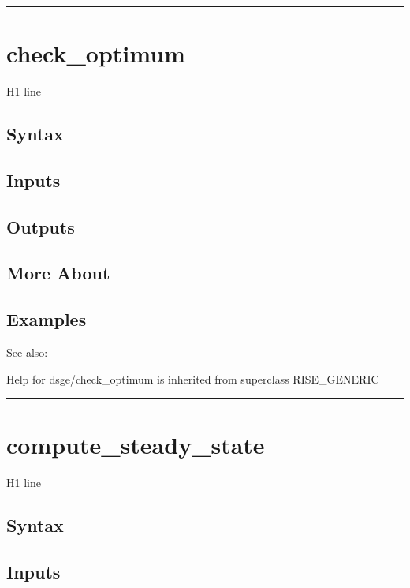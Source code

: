 \documentclass[letterpaper,10pt,english]{sphinxmanual}
\begin{document}
\bigskip\hrule{}\bigskip



\section{check\_optimum}
\label{classes/models/@dsge/dsge:check-optimum}\label{classes/models/@dsge/dsge:id2}
H1 line


\subsection{Syntax}
\label{classes/models/@dsge/dsge:id3}

\subsection{Inputs}
\label{classes/models/@dsge/dsge:id4}

\subsection{Outputs}
\label{classes/models/@dsge/dsge:id5}

\subsection{More About}
\label{classes/models/@dsge/dsge:id6}

\subsection{Examples}
\label{classes/models/@dsge/dsge:id7}
See also:

Help for dsge/check\_optimum is inherited from superclass RISE\_GENERIC


\bigskip\hrule{}\bigskip



\section{compute\_steady\_state}
\label{classes/models/@dsge/dsge:id8}\label{classes/models/@dsge/dsge:compute-steady-state}
H1 line


\subsection{Syntax}
\label{classes/models/@dsge/dsge:id9}

\subsection{Inputs}
\label{classes/models/@dsge/dsge:id10}
\end{document}
